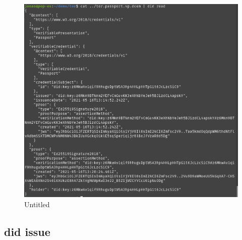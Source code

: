 \begin{itemize}
  \begin{figure}
  \centering
  \includegraphics{User Interface f8759a9462b24d5f95cf6123d68b89ea/Untitled 9.png}
  \caption{Untitled}
  \end{figure}
\end{itemize}

\hypertarget{did-issue}{%
\subsection{\texorpdfstring{did issue }{did issue  }}\label{did-issue}}


